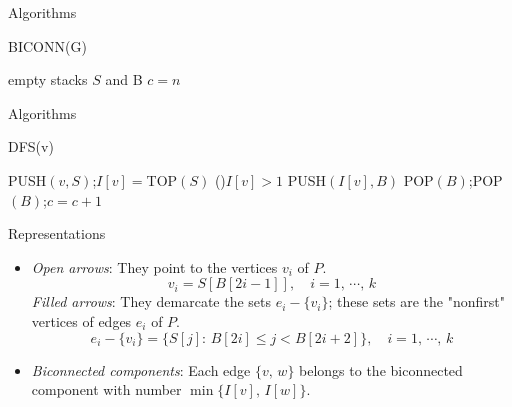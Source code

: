 \documentclass{beamer}
\begin{document}
\begin{frame}{Algorithms}
	\SetAlFnt{\normalsize}
	\begin{procedure}[H]
		\caption{BICONN(G)}
		empty stacks $S$ and B\;
		$c=n$\;
	\end{procedure}
\end{frame}

\begin{frame}{Algorithms}
	\SetAlFnt{\small}
	\begin{procedure}[H]
		\caption{DFS(v)}
		PUSH$(v,S)$;\quad $I[v]=$TOP$(S)$\;
		\If(){$I[v] > 1$}{
			PUSH$(I[v],B)$\;
		}
		 {
			POP$(B)$;\quad POP$(B)$;\quad $c = c + 1$\;
		}
	\end{procedure}
\end{frame}

\begin{frame}{Representations}
	\begin{itemize}
		\item
		\emph{Open arrows}: They point to the vertices $v_i$ of $P$.
		$$v_i=S[B[2i-1]],\quad i=1,\,\cdots,\,k$$
		\emph{Filled arrows}: They demarcate the sets $e_i-\{v_i\}$; these sets
		are the "nonfirst" vertices of edges $e_i$ of $P$.
		$$e_i-\{v_i\}=\{S[j]:\,B[2i]\leq j < B[2i+2]\},\quad i=1,\,\cdots,\,k$$
		\item
		\emph{Biconnected components}: Each edge $\{v,\,w\}$ belongs to the
		biconnected component with number $\min\{I[v],\,I[w]\}$.
	\end{itemize}
\end{frame}
\end{document}
